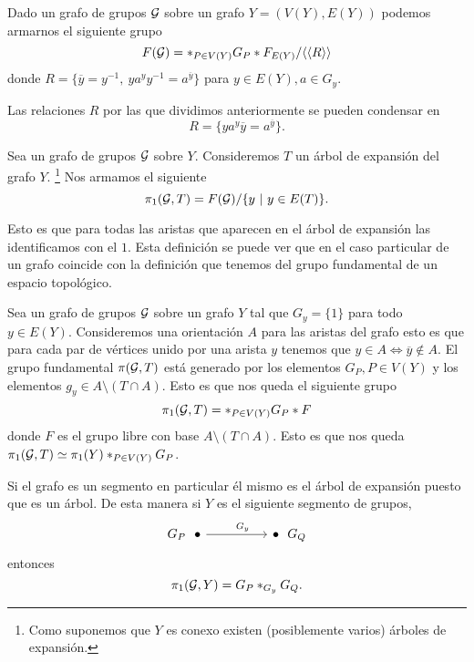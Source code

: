 \documentclass[tesis.tex]{subfiles}
\begin{document}
\begin{deff}
	Dado un grafo de grupos $\cal G$ sobre un grafo $Y = (V(Y), E(Y))$ podemos armarnos el siguiente grupo 
	\begin{equation*}
		F({\cal G}) = \ast_{P \in V(Y)} G_P \ast F_{E(Y)} / \langle \langle  R \rangle \rangle
	\end{equation*}
	donde $R = \{  \overline y = y^{-1}, \ ya^yy^{-1} = a^{\overline y} \}$ para $y \in E(Y), a \in G_y$. 
\end{deff}

\begin{obs}
	Las relaciones $R$ por las que dividimos anteriormente se pueden condensar en 
	\[
	R = \{  ya^y \overline y = a^{\overline y}  \}.
	\]
\end{obs}

\begin{deff} \label{def_pi1_arbol}
	Sea un grafo de grupos $\cal G$ sobre $Y$.
	Consideremos $T$ un árbol de expansión del grafo $Y$.
	\footnote{Como suponemos que $Y$ es conexo existen (posiblemente varios) árboles de expansión.}
	Nos armamos el siguiente 
	\begin{equation*}
		\pi_1({\cal G}, T) = F({\cal G}) / \{ y \  | \ y \in E(T)  \}.
	\end{equation*}
\end{deff}

Esto es que para todas las aristas que aparecen en el árbol de expansión las identificamos con el $1$. 
Esta definición se puede ver que en el caso particular de un grafo coincide con la definición que tenemos del grupo fundamental de un espacio topológico.

\begin{ej}
	Sea un grafo de grupos $\cal G$ sobre un grafo $Y$ tal que $G_y = \{ 1 \}$ para todo $y \in E(Y)$.
	Consideremos una orientación $A$ para las aristas del grafo esto es que para cada par de vértices unido por una arista $y$ tenemos que $y \in A \iff \overline y \notin A$.
	El grupo fundamental $\pi({\cal G}, T)$ está generado por los elementos $G_P, P \in V(Y)$ y los elementos $g_y \in A \setminus (T \cap A)$.
	Esto es que nos queda el siguiente grupo
	\[
	\pi_1({\cal G}, T) = \ast_{P \in V(Y)} G_P \ast F
	\]
	donde $F$ es el grupo libre con base $A \setminus (T \cap A)$.
	Esto es que nos queda $\pi_1({\cal G}, T) \simeq \pi_1(Y) \ast_{P \in V(Y)} G_P$.
\end{ej}

\begin{ej}
	Si el grafo es un segmento en particular él mismo es el árbol de expansión puesto que es un árbol.
	De esta manera si $Y$ es el siguiente segmento de grupos,
	\[\begin{tikzcd}
		{G_P \ \ \bullet} && {\bullet \ \ G_Q}
		\arrow["G_y"{pos=0.6}, from=1-1, to=1-3]
	\end{tikzcd}\]
	entonces
	\[
	\pi_1({\cal G}, Y) = G_P \ast_{G_y} G_Q.
	\]
\end{ej}
\end{document}
